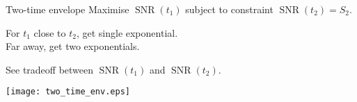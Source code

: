 \documentclass{beamer}%
\DeclareMathOperator{\snr}{SNR}
\newcommand{\pr}{\mathbf{p}}
\newcommand{\eq}{\pr^\infty}
\newcommand{\F}{\boldsymbol{\Phi}}
\newcommand{\CS}{\mathcal{S}}
\newcommand{\comp}{^\mathrm{c}}
\begin{document}
%
%
%
%
%
%

\begin{frame}{Two-time envelope}
%
 Maximise $\snr(t_1)$ subject to constraint $\snr(t_2)=S_2$.

 \vp For $t_1$ close to $t_2$, get single exponential.\\
  Far away, get two exponentials.

 \vp See tradeoff between $\snr(t_1)$ and $\snr(t_2)$.

 \begin{center}
   \texttt{[image: two\_time\_env.eps]}
 \end{center}
%
\end{frame}
\end{document}
